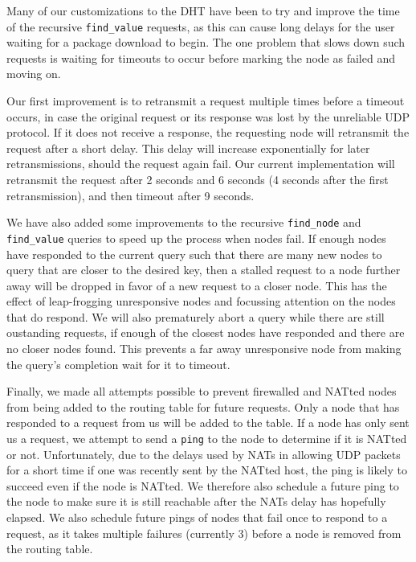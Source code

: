 \documentclass[conference]{IEEEtran}
\begin{document}
Many of our customizations to the DHT have been to try and improve
the time of the recursive \texttt{find\_value} requests, as this can
cause long delays for the user waiting for a package download to
begin. The one problem that slows down such requests is waiting for
timeouts to occur before marking the node as failed and moving on.

Our first improvement is to retransmit a request multiple times
before a timeout occurs, in case the original request or its
response was lost by the unreliable UDP protocol. If it does not
receive a response, the requesting node will retransmit the request
after a short delay. This delay will increase exponentially for
later retransmissions, should the request again fail. Our current
implementation will retransmit the request after 2 seconds and 6
seconds (4 seconds after the first retransmission), and then timeout
after 9 seconds.

We have also added some improvements to the recursive
\texttt{find\_node} and \texttt{find\_value} queries to speed up the
process when nodes fail. If enough nodes have responded to the
current query such that there are many new nodes to query that are
closer to the desired key, then a stalled request to a node further
away will be dropped in favor of a new request to a closer node.
This has the effect of leap-frogging unresponsive nodes and
focussing attention on the nodes that do respond. We will also
prematurely abort a query while there are still oustanding requests,
if enough of the closest nodes have responded and there are no
closer nodes found. This prevents a far away unresponsive node from
making the query's completion wait for it to timeout.

Finally, we made all attempts possible to prevent firewalled and
NATted nodes from being added to the routing table for future
requests. Only a node that has responded to a request from us will
be added to the table. If a node has only sent us a request, we
attempt to send a \texttt{ping} to the node to determine if it is
NATted or not. Unfortunately, due to the delays used by NATs in
allowing UDP packets for a short time if one was recently sent by
the NATted host, the ping is likely to succeed even if the node is
NATted. We therefore also schedule a future ping to the node to make
sure it is still reachable after the NATs delay has hopefully
elapsed. We also schedule future pings of nodes that fail once to
respond to a request, as it takes multiple failures (currently 3)
before a node is removed from the routing table.
\end{document}
